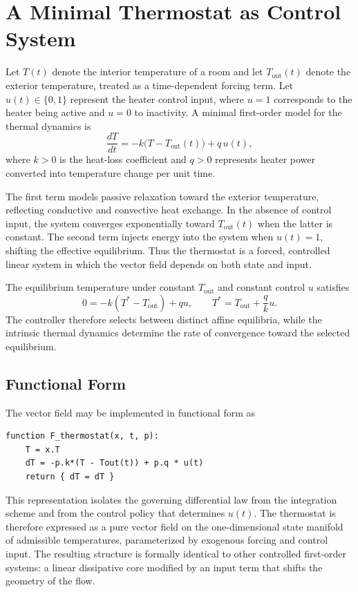 \documentclass[12pt]{book}
\begin{document}
\section{A Minimal Thermostat as Control System}

Let $T(t)$ denote the interior temperature of a room and let
$T_{\mathrm{out}}(t)$ denote the exterior temperature, treated as a
time-dependent forcing term. Let $u(t) \in \{0,1\}$ represent the heater
control input, where $u=1$ corresponds to the heater being active and
$u=0$ to inactivity. A minimal first-order model for the thermal dynamics is
\[
\frac{dT}{dt}
=
- k \big(T - T_{\mathrm{out}}(t)\big)
+
q\, u(t),
\]
where $k > 0$ is the heat-loss coefficient and $q > 0$ represents heater
power converted into temperature change per unit time.

The first term models passive relaxation toward the exterior temperature,
reflecting conductive and convective heat exchange. In the absence of
control input, the system converges exponentially toward
$T_{\mathrm{out}}(t)$ when the latter is constant. The second term injects
energy into the system when $u(t)=1$, shifting the effective equilibrium.
Thus the thermostat is a forced, controlled linear system in which the
vector field depends on both state and input.

The equilibrium temperature under constant $T_{\mathrm{out}}$ and constant
control $u$ satisfies
\[
0
=
- k (T^* - T_{\mathrm{out}}) + q u,
\qquad
T^*
=
T_{\mathrm{out}} + \frac{q}{k} u.
\]
The controller therefore selects between distinct affine equilibria,
while the intrinsic thermal dynamics determine the rate of convergence
toward the selected equilibrium.

\subsection{Functional Form}

The vector field may be implemented in functional form as

\begin{verbatim}
function F_thermostat(x, t, p):
    T = x.T
    dT = -p.k*(T - Tout(t)) + p.q * u(t)
    return { dT = dT }
\end{verbatim}

This representation isolates the governing differential law from the
integration scheme and from the control policy that determines $u(t)$.
The thermostat is therefore expressed as a pure vector field on the
one-dimensional state manifold of admissible temperatures, parameterized
by exogenous forcing and control input. The resulting structure is
formally identical to other controlled first-order systems: a linear
dissipative core modified by an input term that shifts the geometry of
the flow.
\end{document}
